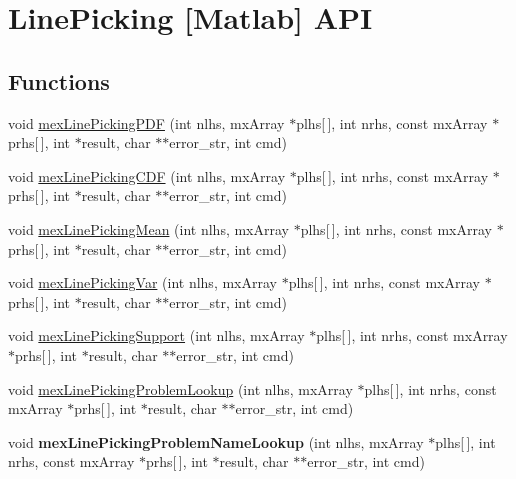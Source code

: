 \hypertarget{group__matlabapi}{\section{Line\-Picking \mbox{[}Matlab\mbox{]} A\-P\-I}
\label{group__matlabapi}
}
\subsection*{Functions}
\begin{DoxyCompactItemize}
\item 
void \hyperlink{group__matlabapi_ga415ab39c370dfeb66324d1a538a8bb7b}{mex\-Line\-Picking\-P\-D\-F} (int nlhs, mx\-Array $\ast$plhs\mbox{[}$\,$\mbox{]}, int nrhs, const mx\-Array $\ast$prhs\mbox{[}$\,$\mbox{]}, int $\ast$result, char $\ast$$\ast$error\-\_\-str, int cmd)
\item 
void \hyperlink{group__matlabapi_ga565be7534fefd6e5547869fdcb21b36f}{mex\-Line\-Picking\-C\-D\-F} (int nlhs, mx\-Array $\ast$plhs\mbox{[}$\,$\mbox{]}, int nrhs, const mx\-Array $\ast$prhs\mbox{[}$\,$\mbox{]}, int $\ast$result, char $\ast$$\ast$error\-\_\-str, int cmd)
\item 
void \hyperlink{group__matlabapi_ga6fe54a6aa7e3d2e51733dea1a443a1b2}{mex\-Line\-Picking\-Mean} (int nlhs, mx\-Array $\ast$plhs\mbox{[}$\,$\mbox{]}, int nrhs, const mx\-Array $\ast$prhs\mbox{[}$\,$\mbox{]}, int $\ast$result, char $\ast$$\ast$error\-\_\-str, int cmd)
\item 
void \hyperlink{group__matlabapi_gaceb40f4eec3174186785fca28818c09f}{mex\-Line\-Picking\-Var} (int nlhs, mx\-Array $\ast$plhs\mbox{[}$\,$\mbox{]}, int nrhs, const mx\-Array $\ast$prhs\mbox{[}$\,$\mbox{]}, int $\ast$result, char $\ast$$\ast$error\-\_\-str, int cmd)
\item 
void \hyperlink{group__matlabapi_gaa1d58f45751e79cccbc82eedccef460e}{mex\-Line\-Picking\-Support} (int nlhs, mx\-Array $\ast$plhs\mbox{[}$\,$\mbox{]}, int nrhs, const mx\-Array $\ast$prhs\mbox{[}$\,$\mbox{]}, int $\ast$result, char $\ast$$\ast$error\-\_\-str, int cmd)
\item 
void \hyperlink{group__matlabapi_ga8b9723f66253c299cb2bd065c48d1d11}{mex\-Line\-Picking\-Problem\-Lookup} (int nlhs, mx\-Array $\ast$plhs\mbox{[}$\,$\mbox{]}, int nrhs, const mx\-Array $\ast$prhs\mbox{[}$\,$\mbox{]}, int $\ast$result, char $\ast$$\ast$error\-\_\-str, int cmd)
\item 
\hypertarget{group__matlabapi_ga0b420739ee82f52e6eb0a9f194708103}{void {\bfseries mex\-Line\-Picking\-Problem\-Name\-Lookup} (int nlhs, mx\-Array $\ast$plhs\mbox{[}$\,$\mbox{]}, int nrhs, const mx\-Array $\ast$prhs\mbox{[}$\,$\mbox{]}, int $\ast$result, char $\ast$$\ast$error\-\_\-str, int cmd)}\label{group__matlabapi_ga0b420739ee82f52e6eb0a9f194708103}


\end{DoxyCompactItemize}
